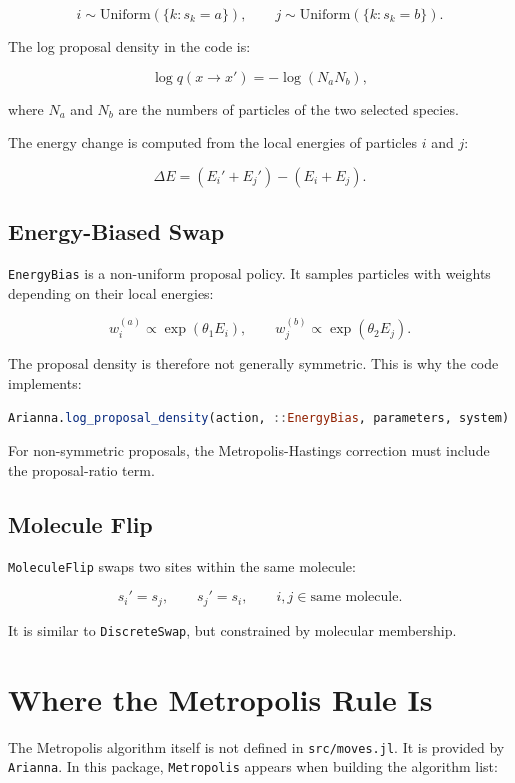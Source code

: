 \documentclass[11pt]{article}
\begin{document}
\[
i \sim \mathrm{Uniform}(\{k:s_k=a\}),
\qquad
j \sim \mathrm{Uniform}(\{k:s_k=b\}).
\]

The log proposal density in the code is:

\[
\log q(x\to x') =
-\log(N_a N_b),
\]

where \(N_a\) and \(N_b\) are the numbers of particles of the two selected
species.

The energy change is computed from the local energies of particles \(i\) and
\(j\):

\[
\Delta E =
\left(E_i' + E_j'\right)
-
\left(E_i + E_j\right).
\]

\subsection{Energy-Biased Swap}

\texttt{EnergyBias} is a non-uniform proposal policy. It samples particles with
weights depending on their local energies:

\[
w_i^{(a)} \propto \exp(\theta_1 E_i),
\qquad
w_j^{(b)} \propto \exp(\theta_2 E_j).
\]

The proposal density is therefore not generally symmetric. This is why the code
implements:

\begin{lstlisting}[language=Julia]
Arianna.log_proposal_density(action, ::EnergyBias, parameters, system)
\end{lstlisting}

For non-symmetric proposals, the Metropolis-Hastings correction must include
the proposal-ratio term.

\subsection{Molecule Flip}

\texttt{MoleculeFlip} swaps two sites within the same molecule:

\[
s_i' = s_j,
\qquad
s_j' = s_i,
\qquad
i,j \in \text{same molecule}.
\]

It is similar to \texttt{DiscreteSwap}, but constrained by molecular membership.

\section{Where the Metropolis Rule Is}

The Metropolis algorithm itself is not defined in \texttt{src/moves.jl}. It is
provided by \texttt{Arianna}. In this package, \texttt{Metropolis} appears when
building the algorithm list:
\end{document}
